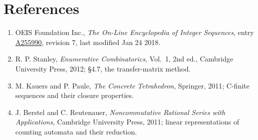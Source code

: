 \documentclass[11pt]{article}
\theoremstyle{definition}
\begin{document}
\section{References}

\begin{enumerate}

\item OEIS Foundation Inc., \emph{The On-Line Encyclopedia of Integer Sequences}, entry \href{https://oeis.org/A255990}{A255990}, revision 7, last modified Jan 24 2018.

\item R. P. Stanley, \emph{Enumerative Combinatorics}, Vol.~1, 2nd ed., Cambridge University Press, 2012; \S4.7, the transfer-matrix method.

\item M. Kauers and P. Paule, \emph{The Concrete Tetrahedron}, Springer, 2011; C-finite sequences and their closure properties.

\item J. Berstel and C. Reutenauer, \emph{Noncommutative Rational Series with Applications}, Cambridge University Press, 2011; linear representations of counting automata and their reduction.

\end{enumerate}
\end{document}
